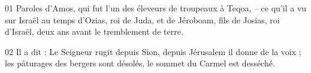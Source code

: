 01 Paroles d'Amos, qui fut l’un des éleveurs de troupeaux à Teqoa, – ce qu’il a vu sur Israël au temps d’Ozias, roi de Juda, et de Jéroboam, fils de Josias, roi d’Israël, deux ans avant le tremblement de terre.

02 Il a dit : Le Seigneur rugit depuis Sion, depuis Jérusalem il donne de la voix ; les pâturages des bergers sont désolés, le sommet du Carmel est desséché.
